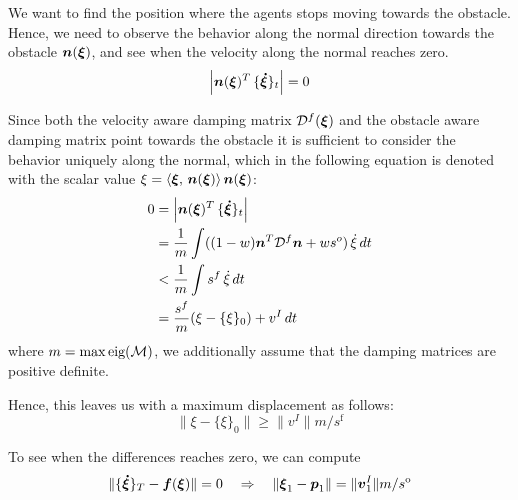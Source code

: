 We want to find the position where the agents stops moving towards the obstacle. Hence, we need to observe the behavior along the normal direction towards the obstacle $\boldsymbol{n}(\boldsymbol{\xi})$, and see when the velocity along the normal reaches zero.  
\begin{equation}
	\left| \boldsymbol{n}(\boldsymbol{\xi})^T \, \{ \boldsymbol{\dot \xi} \}_{t} \right| = 0
\end{equation}

Since both the velocity aware damping matrix $\mathcal{D}^f(\boldsymbol{\xi})$ and the obstacle aware damping matrix point towards the obstacle it is sufficient to consider the behavior uniquely along the normal, which in the following equation is denoted with the scalar value 
$\xi = \left\langle {\boldsymbol{\xi}}, \, {\boldsymbol{n}(\boldsymbol{\xi})} \right\rangle \boldsymbol{n}(\boldsymbol{\xi})$:
\begin{equation}
	\begin{split}
	0 & = \left| \boldsymbol{n}(\boldsymbol{\xi})^T \, \{ \boldsymbol{\dot \xi} \}_{t} \right| \\
	  & = \frac 1 m \int ( (1-w) \boldsymbol{n}^T \mathcal{D}^f \boldsymbol{n} + w s^{o} ) \, {\dot \xi} \, dt \\
	   & < \frac 1 m \int  s^{f}  \, {\dot \xi} \, dt \\
	   & = \frac{s^f}{m} (\xi - \{ \xi \}_0 ) + v^I \, dt \\
  \end{split} 
\end{equation}
where $m = \max{\text{eig}(\mathcal{M})}$, we additionally assume that the damping matrices are positive definite. 

Hence, this leaves us with a maximum displacement as follows:
\begin{equation}
	\| {\xi} - \{\xi \}_0 \| \geq \| v^I \| {m} / {s^{\mathrm{f}}} 
\end{equation}

To see when the differences reaches zero, we can compute
\begin{equation}
 \|	\{ \boldsymbol{\dot \xi} \}_T - \boldsymbol{f}(\boldsymbol{\xi}) \| = 0
 \quad \Rightarrow \quad
    \| \boldsymbol{\xi}_1 -  \boldsymbol{p}_1 \| = \| \boldsymbol{v}^I_1 \| {m} / {s^{\mathrm{o}}} 
 \end{equation}

